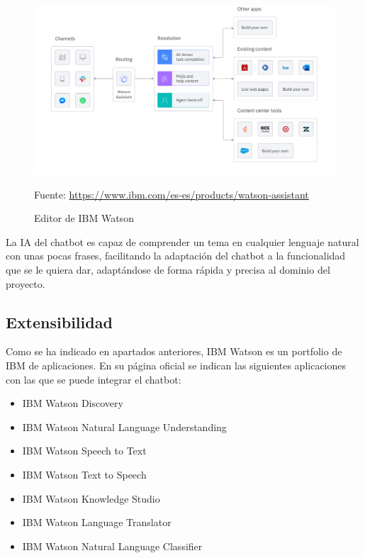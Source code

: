 \begin{figure}[h]
\centering
\includegraphics[width=1.0\textwidth]{imagenes/02_EstadoDelArte/editor_IBM_Watson.png}
\begin{center}
Fuente: \url{https://www.ibm.com/es-es/products/watson-assistant}
\end{center}
\caption{Editor de IBM Watson}
\end{figure}

La IA del chatbot es capaz de comprender un tema en cualquier lenguaje natural con unas pocas frases, facilitando la adaptación del chatbot a la funcionalidad que se le quiera dar, adaptándose de forma rápida y precisa al dominio del proyecto.

\subsection*{Extensibilidad}

Como se ha indicado en apartados anteriores, IBM Watson es un \gls{portfolio} de IBM de aplicaciones. En su página oficial \cite{RefWorks:RefID:19-2021productos} se indican las siguientes aplicaciones con las que se puede integrar el chatbot:

\begin{itemize}
\item IBM Watson Discovery
\item IBM Watson Natural Language Understanding
\item IBM Watson Speech to Text
\item IBM Watson Text to Speech
\item IBM Watson Knowledge Studio
\item IBM Watson Language Translator
\item IBM Watson Natural Language Classifier
\end{itemize}

